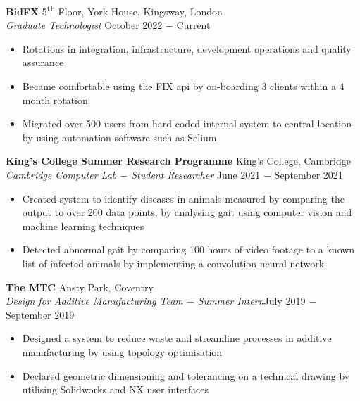 \documentclass{article}
\begin{document}
\textbf{BidFX} \hfill 5\textsuperscript{th} Floor, York House, Kingsway, London\\
\textit{Graduate Technologist} \hfill October 2022 $-$ Current
\begin{itemize}
    \item Rotations in integration, infrastructure, development operations and quality assurance
    \item Became comfortable using the FIX api by on-boarding 3 clients within a 4 month rotation
    \item Migrated over 500 users from hard coded internal system to central location by using automation software such as Selium
\end{itemize} \smallskip

\textbf{King's College Summer Research Programme} \hfill King's College, Cambridge \\
\textit{Cambridge Computer Lab $-$ Student Researcher} \hfill June 2021 $-$ September 2021
\begin{itemize}
    \item Created system to identify diseases in animals measured by comparing the output to over 200 data points, by analysing gait using computer vision and machine learning techniques
    \item Detected abnormal gait by comparing 100 hours of video footage to a known list of infected animals by implementing a convolution neural network 
\end{itemize} \smallskip

\textbf{The MTC} \hfill Ansty Park, Coventry \\
\textit{Design for Additive Manufacturing Team $-$ Summer Intern}\hfill July 2019 $-$ September 2019
\begin{itemize}
    \item Designed a system to reduce waste and streamline processes in additive manufacturing by using topology optimisation
    \item Declared geometric dimensioning and tolerancing on a technical drawing by utilising Solidworks and NX user interfaces
\end{itemize} \smallskip
\end{document}
